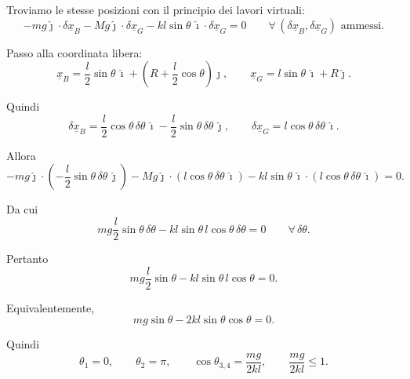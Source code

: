 \begin{example}{}
\begin{center}
\end{center}

Troviamo le stesse posizioni con il principio dei lavori virtuali:
\[
-mg\hat{\jmath}\cdot \delta \underline{x}_B
-Mg\hat{\jmath}\cdot \delta \underline{x}_G
-kl\sin\theta\,\hat{\imath}\cdot \delta \underline{x}_G
=0
\qquad
\forall\,(\delta \underline{x}_B,\delta \underline{x}_G)
\text{ ammessi}.
\]

Passo alla coordinata libera:
\[
\underline{x}_B
=
\frac{l}{2}\sin\theta\,\hat{\imath}
+
\left(
R+\frac{l}{2}\cos\theta
\right)\hat{\jmath},
\qquad
\underline{x}_G
=
l\sin\theta\,\hat{\imath}
+
R\hat{\jmath}.
\]

Quindi
\[
\delta \underline{x}_B
=
\frac{l}{2}\cos\theta\,\delta\theta\,\hat{\imath}
-
\frac{l}{2}\sin\theta\,\delta\theta\,\hat{\jmath},
\qquad
\delta \underline{x}_G
=
l\cos\theta\,\delta\theta\,\hat{\imath}.
\]

Allora
\[
-mg\hat{\jmath}\cdot
\left(
-\frac{l}{2}\sin\theta\,\delta\theta\,\hat{\jmath}
\right)
-
Mg\hat{\jmath}\cdot
\left(
l\cos\theta\,\delta\theta\,\hat{\imath}
\right)
-
kl\sin\theta\,\hat{\imath}\cdot
\left(
l\cos\theta\,\delta\theta\,\hat{\imath}
\right)
=0.
\]

Da cui
\[
mg\frac{l}{2}\sin\theta\,\delta\theta
-
kl\sin\theta\,l\cos\theta\,\delta\theta
=0
\qquad
\forall\,\delta\theta.
\]

Pertanto
\[
mg\frac{l}{2}\sin\theta
-
kl\sin\theta\,l\cos\theta
=0.
\]

Equivalentemente,
\[
mg\sin\theta
-
2kl\sin\theta\cos\theta
=0.
\]

Quindi
\[
\theta_1=0,
\qquad
\theta_2=\pi,
\qquad
\cos\theta_{3,4}
=
\frac{mg}{2kl},
\qquad
\frac{mg}{2kl}\leq 1.
\]
\end{example}

